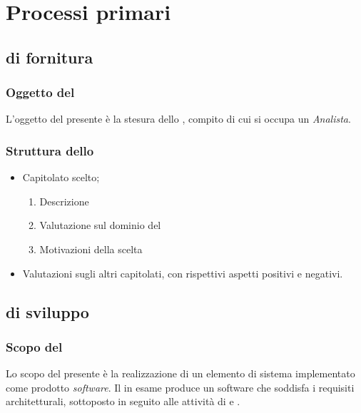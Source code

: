 \section{Processi primari}

	\subsection{ di fornitura}	
	\subsubsection{Oggetto del }
	L'oggetto del presente  è la stesura dello \StudioDiFattibilita, compito
	di cui si occupa un \textit{Analista}.
	\subsubsection{Struttura dello \StudioDiFattibilita}
		\begin{itemize}
			\item Capitolato scelto;
				\begin{enumerate}
					\item Descrizione
					\item Valutazione sul dominio del 
					\item Motivazioni della scelta
				\end{enumerate}	
			\item Valutazioni sugli altri capitolati, con rispettivi aspetti positivi e negativi.
		\end{itemize}


	\subsection{ di sviluppo}
        \subsubsection{Scopo del }
        Lo scopo del presente  \`e la realizzazione di un elemento di sistema implementato come prodotto
        \textit{software}. Il  in esame produce un software che soddisfa i requisiti architetturali, sottoposto
        in seguito alle attivit\`a di  e .

